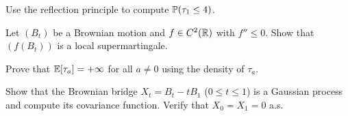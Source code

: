 \begin{exercise}
Use the reflection principle to compute $\mathbb{P}(\tau_1 \leq 4)$.
\end{exercise}

\begin{exercise}
Let $(B_t)$ be a Brownian motion and $f \in C^2(\mathbb{R})$ with $f'' \leq 0$. Show
that $(f(B_t))$ is a local supermartingale.
\end{exercise}

\begin{exercise}
Prove that $\mathbb{E}[\tau_a] = +\infty$ for all $a \neq 0$ using the density of $\tau_a$.
\end{exercise}

\begin{exercise}
Show that the Brownian bridge $X_t = B_t - tB_1$ ($0 \leq t \leq 1$) is a
Gaussian process and compute its covariance function. Verify that
$X_0 = X_1 = 0$ a.s.
\end{exercise}
